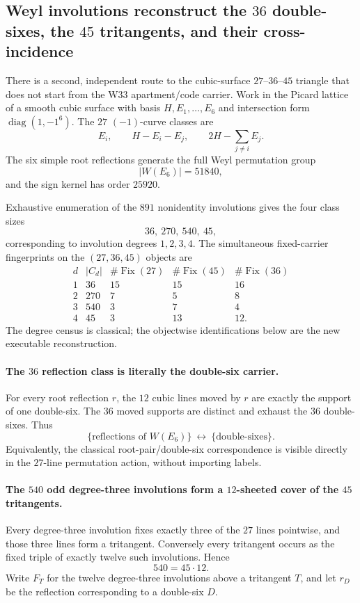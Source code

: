 \subsection{Weyl involutions reconstruct the $36$ double-sixes, the $45$ tritangents, and their cross-incidence}
\label{sec:20260917-e6-involution-36-45}

There is a second, independent route to the cubic-surface $27$--$36$--$45$
triangle that does not start from the W33 apartment/code carrier.  Work in the
Picard lattice of a smooth cubic surface with basis $H,E_1,\ldots,E_6$ and
intersection form $\operatorname{diag}(1,-1^6)$.  The $27$ $(-1)$-curve
classes are
\[
 E_i,\qquad H-E_i-E_j,\qquad
 2H-\sum_{j\ne i}E_j.
\]
The six simple root reflections generate the full Weyl permutation group
\[
 |W(E_6)|=51840,
\]
and the sign kernel has order $25920$.

Exhaustive enumeration of the $891$ nonidentity involutions gives the four
class sizes
\[
 \boxed{36,\ 270,\ 540,\ 45},
\]
corresponding to involution degrees $1,2,3,4$.  The simultaneous fixed-carrier
fingerprints on the $(27,36,45)$ objects are
\[
\begin{array}{c|c|c|c|c}
 d & |C_d| & \#\operatorname{Fix}(27) &
 \#\operatorname{Fix}(45) & \#\operatorname{Fix}(36)\\ \hline
 1&36 &15&15&16\\
 2&270& 7& 5& 8\\
 3&540& 3& 7& 4\\
 4&45 & 3&13&12.
\end{array}
\]
The degree census is classical; the objectwise identifications below are the
new executable reconstruction.

\paragraph{The $36$ reflection class is literally the double-six carrier.}
For every root reflection $r$, the $12$ cubic lines moved by $r$ are exactly the
support of one double-six.  The $36$ moved supports are distinct and exhaust the
$36$ double-sixes.  Thus
\[
 \boxed{\{\text{reflections of }W(E_6)\}\ \longleftrightarrow\
        \{\text{double-sixes}\}}.
\]
Equivalently, the classical root-pair/double-six correspondence is visible
directly in the $27$-line permutation action, without importing labels.

\paragraph{The $540$ odd degree-three involutions form a $12$-sheeted cover of the $45$ tritangents.}
Every degree-three involution fixes exactly three of the $27$ lines pointwise,
and those three lines form a tritangent.  Conversely every tritangent occurs as
the fixed triple of exactly twelve such involutions.  Hence
\[
 \boxed{540=45\cdot12}.
\]
Write $F_T$ for the twelve degree-three involutions above a tritangent $T$,
and let $r_D$ be the reflection corresponding to a double-six $D$.

